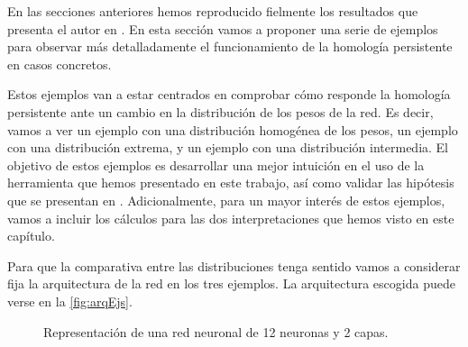 \documentclass[12pt, a4paper, twoside]{book}
\numberwithin{equation}{section}
\theoremstyle{definition}
\theoremstyle{remark}
\theoremstyle{plain}
\begin{document}
	En las secciones anteriores hemos reproducido fielmente los
	resultados que presenta el autor en \cite{Articulo-Watanabe}. En esta 
	sección vamos a proponer una serie de ejemplos para observar más 
	detalladamente el funcionamiento de la homología persistente en casos 
	concretos. 

	Estos ejemplos van a estar centrados en comprobar cómo responde la 
	homología persistente ante un cambio en la distribución de los pesos 
	de la red. Es decir, vamos a ver un ejemplo con una distribución 
	homogénea de los pesos, un ejemplo con una distribución extrema, y un 
	ejemplo con una distribución intermedia. El objetivo de estos ejemplos 
	es desarrollar una mejor intuición en el uso de la herramienta que 
	hemos presentado en este trabajo, así como validar las hipótesis que
	se presentan en \cite{Articulo-Watanabe}. Adicionalmente, para un 
	mayor interés de estos ejemplos, vamos a incluir los cálculos para 
	las dos interpretaciones que hemos visto en este capítulo. 

	Para que la comparativa entre las distribuciones tenga sentido vamos 
	a considerar fija la arquitectura de la red en los tres ejemplos. La 
	arquitectura escogida puede verse en la \autoref{fig:arqEjs}.

	\begin{figure}[!htbp]
		\centering
			\caption{Representación de una red neuronal de 12 
			neuronas y 2 capas.}
			\label{fig:arqEjs}
	\end{figure}
	
\end{document}
